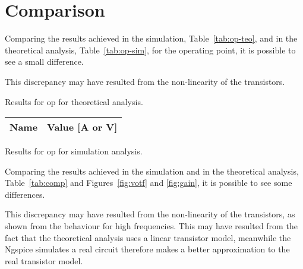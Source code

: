 \clearpage
\section{Comparison}
\label{sec:comparison}

Comparing the results achieved in the simulation, Table~\ref{tab:op-teo}, and in the
theoretical analysis, Table~\ref{tab:op-sim}, for the operating point, it is possible to see a small difference.

This discrepancy may have resulted from the non-linearity of the transistors.\\

\begin{minipage}[b]{0.49\textwidth}
    \centering
    
    \captionsetup{type=table}
    \caption{Results for op for theoretical analysis.}
    \label{tab:op-teo}
\end{minipage}
\begin{minipage}[b]{0.49\textwidth}
    \centering
    \begin{tabular}{|c|c|}
      \hline    
     \textbf{Name}  & \textbf{Value [A or V]} \\ \hline
    
    \end{tabular}
    \captionsetup{type=table}
    \caption{Results for op for simulation analysis.}
    \label{tab:op-sim}
\end{minipage}


Comparing the results achieved in the simulation and in the theoretical analysis, Table~\ref{tab:comp} and Figures~\ref{fig:votf} and \ref{fig:gain}, it is possible to see some differences.

This discrepancy may have resulted from the non-linearity of the transistors, as shown from the behaviour for high frequencies. This may have resulted from the fact that the theoretical analysis uses a linear transistor model, meanwhile the Ngspice simulates a real circuit therefore makes a better approximation to the real transistor model.\\



